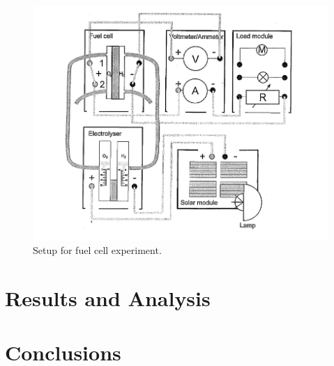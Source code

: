 \documentclass{article}
\begin{document}
    \begin{figure}
        \centering
        \includegraphics[scale=0.3]{./four.png}
        \caption{Setup for fuel cell experiment. \cite{SCE}}
    \end{figure}
    \section{Results and Analysis}
    
    \section{Conclusions}
\end{document}
